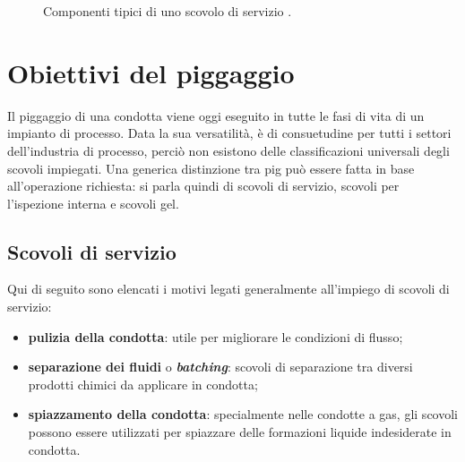 \begin{figure}[htbp]
     \qquad
\caption{Componenti tipici di uno scovolo di servizio \parencite{williamson2015guide}.}
\label{fig:dispositivi}
\end{figure}

\section{Obiettivi del piggaggio}
Il piggaggio di una condotta viene oggi eseguito in tutte le fasi di vita di un impianto di processo. Data la sua versatilità, è di consuetudine per tutti i settori dell'industria di processo, perciò non esistono delle classificazioni universali degli scovoli impiegati. Una generica distinzione tra pig può essere fatta in base all'operazione richiesta: si parla quindi di scovoli di servizio, scovoli per l'ispezione interna e scovoli gel.

\subsection{Scovoli di servizio}
Qui di seguito sono elencati i motivi legati generalmente all'impiego di scovoli di servizio:
\begin{itemize}
	\item \textbf{pulizia della condotta}: utile per migliorare le condizioni di flusso;
	\item \textbf{separazione dei fluidi} o \textit{\textbf{batching}}: scovoli di separazione tra diversi prodotti chimici da applicare in condotta;
	\item \textbf{spiazzamento della condotta}: specialmente nelle condotte a gas, gli scovoli possono essere utilizzati per spiazzare delle formazioni liquide indesiderate in condotta.
\end{itemize}

